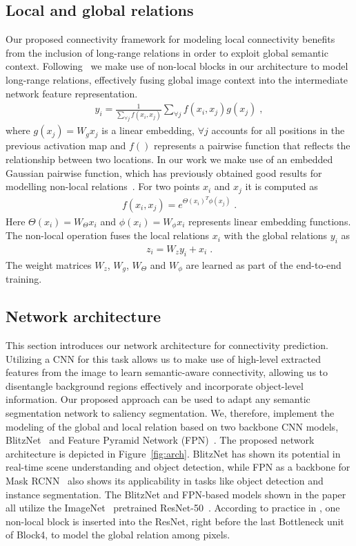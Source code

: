 \documentclass[journal]{IEEEtran}
\begin{document}
\subsection{Local and global relations}
\label{sec:localVsGlobal}
Our proposed connectivity framework for modeling local connectivity benefits from the inclusion of long-range relations in order to exploit global semantic context. Following~\cite{wang2017non} we make use of non-local blocks in our architecture to model long-range relations, effectively fusing global image context into the intermediate network feature representation.
\begin{align}
    y_i = \frac{1}{\sum_{\forall j}f(x_i,x_j)}\sum_{\forall j} f(x_i, x_j) g(x_j) \; ,
\end{align}
where $g(x_j)=W_g x_j$ is a linear embedding, $\forall j$ accounts for all positions in the previous activation map and $f()$ represents a pairwise function that reflects the relationship between two locations. In our work we make use of an embedded Gaussian pairwise function, which has previously obtained good results for modelling non-local relations~\cite{wang2017non}. For two points $x_i$ and $x_j$ it is computed as 
\begin{align}
f(x_i, x_j) = e^{\Theta(x_i)^T\phi(x_j)} \; .
\end{align}
Here $\Theta(x_i)=W_\Theta x_i$ and $\phi(x_i)=W_\phi x_i$ represents linear embedding functions.
The non-local operation fuses the local relations $x_i$ with the global relations $y_i$ as 
\begin{align}
    z_i = W_zy_i + x_i \; .
\end{align}
The weight matrices $W_z$, $W_g$, $W_\Theta$ and $W_\phi$ are learned as part of the end-to-end training.

\subsection{Network architecture}
\label{sec:arch}
This section introduces our network architecture for connectivity prediction. Utilizing a CNN for this task allows us to make use of high-level extracted features from the image to learn semantic-aware connectivity, allowing us to disentangle background regions effectively and incorporate object-level information. Our proposed approach can be used to adapt any semantic segmentation network to saliency segmentation.
We, therefore, implement the modeling of the global and local relation based on two backbone CNN models, BlitzNet~\cite{dvornik2017blitznet} and Feature Pyramid Network (FPN)~\cite{lin2016feature}. The proposed network architecture is depicted in Figure~\ref{fig:arch}. BlitzNet has shown its potential in real-time scene understanding and object detection, while FPN as a backbone for Mask RCNN~\cite{he2017mask} also shows its applicability in tasks like object detection and instance segmentation. The BlitzNet and FPN-based models shown in the paper all utilize the ImageNet~\cite{deng2009imagenet} pretrained ResNet-50~\cite{he2016deep}. According to practice in \cite{wang2017non}, one non-local block is inserted into the ResNet, right before the last Bottleneck unit of Block4, to model the global relation among pixels.
\end{document}
